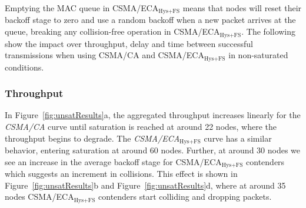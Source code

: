 
	
	Emptying the MAC queue in CSMA/ECA$_{\text{Hys+FS}}$ means that nodes will reset their backoff stage to zero and use a random backoff when a new packet arrives at the queue, breaking any collision-free operation in CSMA/ECA$_{\text{Hys+FS}}$. The following show the impact over throughput, delay and time between successful transmissions when using CSMA/CA and CSMA/ECA$_{\text{Hys+FS}}$ in non-saturated conditions.\\
	
	\subsubsection{Throughput}
	
	
	In Figure~\ref{fig:unsatResults}a, the aggregated throughput increases linearly for the \emph{CSMA/CA} curve until saturation is reached at around 22 nodes, where the throughput begins to degrade. The \emph{CSMA/ECA$_{\text{Hys+FS}}$} curve has a similar behavior, entering saturation at around 60 nodes. Further, at around 30 nodes we see an increase in the average backoff stage for CSMA/ECA$_{\text{Hys+FS}}$ contenders which suggests an increment in collisions. This effect is shown in Figure~\ref{fig:unsatResults}b and Figure~\ref{fig:unsatResults}d, where at around 35 nodes CSMA/ECA$_{\text{Hys+FS}}$ contenders start colliding and dropping packets. 
	
